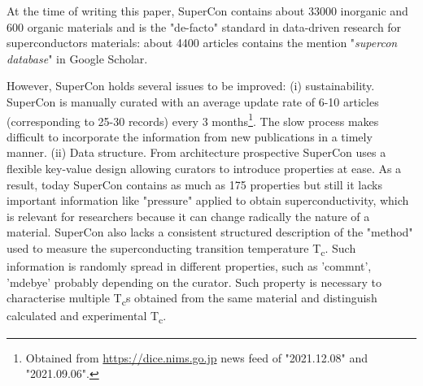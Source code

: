 \documentclass{article}
\begin{document}
At the time of writing this paper, SuperCon contains about 33000 inorganic and 600 organic materials and is the "de-facto" standard in data-driven research for superconductors materials: about 4400 articles contains the mention "\textit{supercon database}" in Google Scholar. 



However, SuperCon holds several issues to be improved: (i) sustainability. 
SuperCon is manually curated with an average update rate of 6-10 articles (corresponding to 25-30 records) every 3 months\footnote{Obtained from \url{https://dice.nims.go.jp} news feed of "2021.12.08" and "2021.09.06".}. 
The slow process makes difficult to incorporate the information from new publications in a timely manner.
(ii) Data structure. From architecture prospective SuperCon uses a flexible key-value design allowing curators to introduce properties at ease. 
As a result, today SuperCon contains as much as 175 properties but still it lacks important information like "pressure" applied to obtain superconductivity, which is relevant for researchers because it can change radically the nature of a material. 
SuperCon also lacks a consistent structured description of the "method" used to measure the superconducting transition temperature T\textsubscript{c}. Such information is randomly spread in different properties, such as 'commnt', 'mdebye' probably depending on the curator. 
Such property is necessary to characterise multiple T\textsubscript{c}s obtained from the same material and distinguish calculated and experimental T\textsubscript{c}. 
\end{document}
